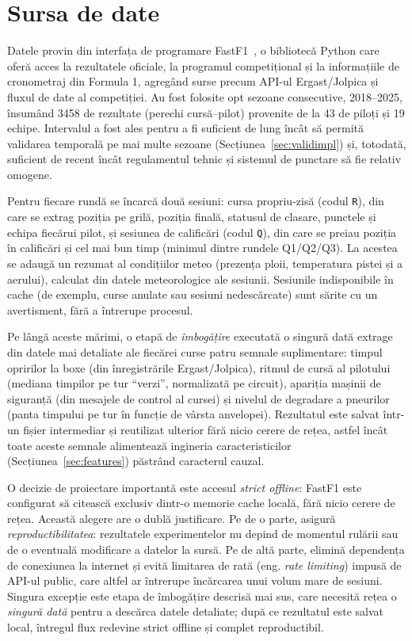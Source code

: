 \documentclass[12pt,a4paper]{report}
\begin{document}
\section{Sursa de date}
\label{sec:date}

Datele provin din interfața de programare FastF1~\cite{fastf1}, o bibliotecă Python care oferă
acces la rezultatele oficiale, la programul competițional și la informațiile de cronometraj din
Formula 1, agregând surse precum API-ul Ergast/Jolpica și fluxul de date al competiției. Au fost
folosite opt sezoane consecutive, 2018--2025, însumând 3458 de rezultate (perechi cursă--pilot)
provenite de la 43 de piloți și 19 echipe. Intervalul a fost ales pentru a fi suficient de lung
încât să permită validarea temporală pe mai multe sezoane (Secțiunea~\ref{sec:validimpl}) și,
totodată, suficient de recent încât regulamentul tehnic și sistemul de punctare să fie relativ
omogene.

Pentru fiecare rundă se încarcă două sesiuni: cursa propriu-zisă (codul \texttt{R}), din care se
extrag poziția pe grilă, poziția finală, statusul de clasare, punctele și echipa fiecărui pilot,
și sesiunea de calificări (codul \texttt{Q}), din care se preiau poziția în calificări și cel mai
bun timp (minimul dintre rundele Q1/Q2/Q3). La acestea se adaugă un rezumat al condițiilor meteo
(prezența ploii, temperatura pistei și a aerului), calculat din datele meteorologice ale sesiunii.
Sesiunile indisponibile în cache (de exemplu, curse anulate sau sesiuni nedescărcate) sunt sărite
cu un avertisment, fără a întrerupe procesul.

Pe lângă aceste mărimi, o etapă de \emph{îmbogățire} executată o singură dată extrage din datele
mai detaliate ale fiecărei curse patru semnale suplimentare: timpul opririlor la boxe (din
înregistrările Ergast/Jolpica), ritmul de cursă al pilotului (mediana timpilor pe tur ``verzi'',
normalizată pe circuit), apariția mașinii de siguranță (din mesajele de control al cursei) și
nivelul de degradare a pneurilor (panta timpului pe tur în funcție de vârsta anvelopei). Rezultatul
este salvat într-un fișier intermediar și reutilizat ulterior fără nicio cerere de rețea, astfel
încât toate aceste semnale alimentează ingineria caracteristicilor (Secțiunea~\ref{sec:features})
păstrând caracterul cauzal.

O decizie de proiectare importantă este accesul \emph{strict offline}: FastF1 este configurat să
citească exclusiv dintr-o memorie cache locală, fără nicio cerere de rețea. Această alegere are o
dublă justificare. Pe de o parte, asigură \emph{reproductibilitatea}: rezultatele experimentelor
nu depind de momentul rulării sau de o eventuală modificare a datelor la sursă. Pe de altă parte,
elimină dependența de conexiunea la internet și evită limitarea de rată (eng. \emph{rate
limiting}) impusă de API-ul public, care altfel ar întrerupe încărcarea unui volum mare de
sesiuni. Singura excepție este etapa de îmbogățire descrisă mai sus, care necesită rețea o
\emph{singură dată} pentru a descărca datele detaliate; după ce rezultatul este salvat local,
întregul flux redevine strict offline și complet reproductibil.
\end{document}
